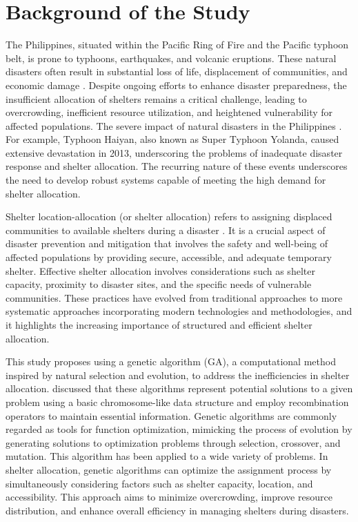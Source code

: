 \section{Background of the Study}

The Philippines, situated within the Pacific Ring of Fire and the Pacific typhoon belt, is prone to typhoons, earthquakes, and volcanic eruptions.
These natural disasters often result in substantial loss of life, displacement of communities, and economic damage \parencite{Iuchi2019}. Despite ongoing efforts to enhance disaster preparedness, the insufficient allocation of shelters remains a critical challenge, leading to overcrowding, inefficient resource utilization, and heightened vulnerability for affected populations. The severe impact of natural disasters in the Philippines \parencite{Iuchi2019}. For example, Typhoon Haiyan, also known as Super Typhoon Yolanda, caused extensive devastation in 2013, underscoring the problems of inadequate disaster response and shelter allocation. The recurring nature of these events underscores the need to develop robust systems capable of meeting the high demand for shelter allocation.

Shelter location-allocation (or shelter allocation) refers to assigning displaced communities to available shelters during a disaster \parencite{Yin2023}. It is a crucial aspect of disaster prevention and mitigation that involves the safety and well-being of affected populations by providing secure, accessible, and adequate temporary shelter. Effective shelter allocation involves considerations such as shelter capacity, proximity to disaster sites, and the specific needs of vulnerable communities. These practices have evolved from traditional approaches to more systematic approaches incorporating modern technologies and methodologies, and it highlights the increasing importance of structured and efficient shelter allocation.

This study proposes using a genetic algorithm (GA), a computational method inspired by natural selection and evolution, to address the inefficiencies in shelter allocation. \textcite{Mathew2012} discussed that these algorithms represent potential solutions to a given problem using a basic chromosome-like data structure and employ recombination operators to maintain essential information. Genetic algorithms are commonly regarded as tools for function optimization, mimicking the process of evolution by generating solutions to optimization problems through selection, crossover, and mutation. This algorithm has been applied to a wide variety of problems. In shelter allocation, genetic algorithms can optimize the assignment process by simultaneously considering factors such as shelter capacity, location, and accessibility. This approach aims to minimize overcrowding, improve resource distribution, and enhance overall efficiency in managing shelters during disasters.

